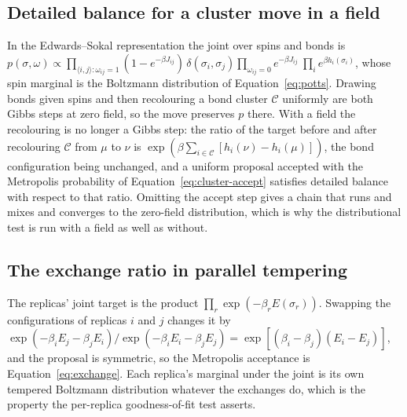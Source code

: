 \documentclass[11pt,a4paper]{article}
\begin{document}
\subsection{Detailed balance for a cluster move in a field}
\label{app:detailed-balance}
In the Edwards--Sokal representation the joint over spins and bonds is
$p(\sigma, \omega) \propto \prod_{\langle i,j \rangle : \omega_{ij} = 1}
(1 - e^{-\beta J_{ij}})\,\delta(\sigma_i, \sigma_j) \prod_{\omega_{ij} = 0}
e^{-\beta J_{ij}}\ \prod_i e^{\beta h_i(\sigma_i)}$, whose spin marginal is the
Boltzmann distribution of Equation~\ref{eq:potts}. Drawing bonds given spins
and then recolouring a bond cluster $\mathcal{C}$ uniformly are both Gibbs
steps at zero field, so the move preserves $p$ there. With a field the
recolouring is no longer a Gibbs step: the ratio of the target before and after
recolouring $\mathcal{C}$ from $\mu$ to $\nu$ is $\exp(\beta \sum_{i \in
\mathcal{C}} [h_i(\nu) - h_i(\mu)])$, the bond configuration being unchanged,
and a uniform proposal accepted with the Metropolis probability of
Equation~\ref{eq:cluster-accept} satisfies detailed balance with respect to
that ratio. Omitting the accept step gives a chain that runs and mixes and
converges to the zero-field distribution, which is why the distributional
test is run with a field as well as without.

\subsection{The exchange ratio in parallel tempering}
\label{app:exchange}
The replicas' joint target is the product $\prod_r \exp(-\beta_r E(\sigma_r))$.
Swapping the configurations of replicas $i$ and $j$ changes it by
$\exp(-\beta_i E_j - \beta_j E_i) / \exp(-\beta_i E_i - \beta_j E_j)
= \exp[(\beta_i - \beta_j)(E_i - E_j)]$, and the proposal is symmetric, so the
Metropolis acceptance is Equation~\ref{eq:exchange}. Each replica's marginal
under the joint is its own tempered Boltzmann distribution whatever the
exchanges do, which is the property the per-replica goodness-of-fit test
asserts.
\end{document}
